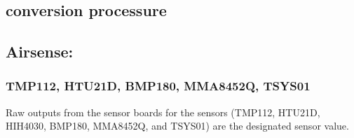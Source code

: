 \subsection{ conversion processure}
\subsection{Airsense:}
\subsubsection{ TMP112, HTU21D, BMP180, MMA8452Q, TSYS01} \label{ssec:first}

Raw outputs from the sensor boards for the sensors (TMP112, HTU21D, HIH4030, BMP180, MMA8452Q, and TSYS01) are the designated sensor value.


% 

